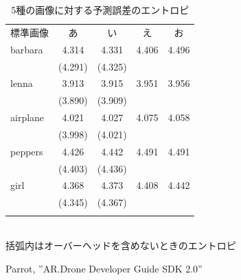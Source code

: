 \documentclass[9pt,dvipdfmx,uplatex]{jsarticle}
\begin{document}
\begin{table}[t]
\begin{center}
\caption{5種の画像に対する予測誤差のエントロピ}\label{takago-paper2008080800268-tab:1}
\begin{tabular}{lcccc}
\noalign{\hrule height 1pt}
標準画像 & あ & い & え &お\\
\noalign{\hrule height 1pt} 
barbara &4.314&4.331&4.406&4.496\\
        &(4.291)&(4.325)&\\\hline
lenna   &3.913&3.915&3.951&3.956\\
        &(3.890)&(3.909)\\\hline
airplane&4.021&4.027&4.075&4.058\\
        &(3.998)&(4.021)\\\hline
peppers &4.426&4.442&4.491&4.491\\
        &(4.403)&(4.436)\\\hline
girl    &4.368&4.373&4.408&4.442\\
        &(4.345)&(4.367)\\
\noalign{\hrule height 1pt}
\end{tabular}\\
括弧内はオーバーヘッドを含めないときのエントロピ
\end{center}
\end{table}


\begin{thebibliography}{99}
Parrot, ''AR.Drone Developer Guide SDK 2.0''
\end{thebibliography}
\end{document}
